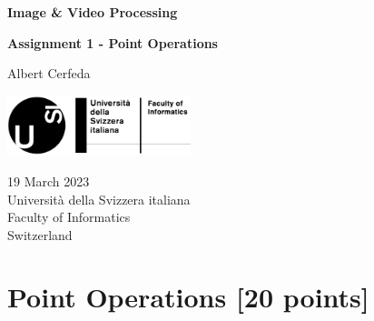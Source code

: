 \documentclass[tikz,14pt,fleqn]{article}
\newcommand\namesurname{Albert Cerfeda}
\newcommand\assignment{Assignment 1 - Point Operations}
\newcommand\subject{Image \& Video Processing}
\newcommand\documentdate{19 March 2023}
\begin{document}
\begin{titlepage}
   \begin{center}
       \vspace*{0.2cm}

       \textbf{\Large{\subject}}

       \vspace{0.5cm}
        \textbf{\assignment}\\[5mm]
        
            
       \vspace{0.4cm}

        \namesurname
        \begin{figure}[H]
            \centering
        \end{figure}
       \tableofcontents

       \vspace*{\fill}
     
        \includegraphics[width=0.4\textwidth]{fig/logo.png}
       
        \documentdate \\
        Università della Svizzera italiana\\
        Faculty of Informatics\\
        Switzerland\\

   \end{center}
\end{titlepage}

\section{Point Operations [20 points]}
\end{document}
